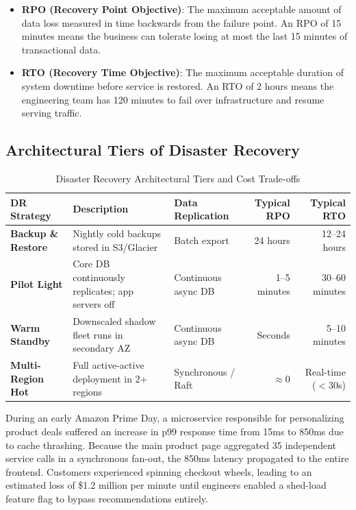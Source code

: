 \begin{itemize}[leftmargin=18pt]
  \item \textbf{RPO (Recovery Point Objective)}: The maximum acceptable amount of data loss measured in time backwards from the failure point. An RPO of 15 minutes means the business can tolerate losing at most the last 15 minutes of transactional data.
  \item \textbf{RTO (Recovery Time Objective)}: The maximum acceptable duration of system downtime before service is restored. An RTO of 2 hours means the engineering team has 120 minutes to fail over infrastructure and resume serving traffic.
\end{itemize}

\subsection{Architectural Tiers of Disaster Recovery}

\begin{table}[htbp]
\centering\small
\begin{tabular}{lllrr}
\toprule
\textbf{DR Strategy} & \textbf{Description} & \textbf{Data Replication} & \textbf{Typical RPO} & \textbf{Typical RTO} \\
\midrule
\textbf{Backup \& Restore} & Nightly cold backups stored in S3/Glacier & Batch export & 24 hours & 12--24 hours \\
\textbf{Pilot Light} & Core DB continuously replicates; app servers off & Continuous async DB & 1--5 minutes & 30--60 minutes \\
\textbf{Warm Standby} & Downscaled shadow fleet runs in secondary AZ & Continuous async DB & Seconds & 5--10 minutes \\
\textbf{Multi-Region Hot} & Full active-active deployment in 2+ regions & Synchronous / Raft & $\approx 0$ & Real-time ($<30$s) \\
\bottomrule
\end{tabular}
\caption{Disaster Recovery Architectural Tiers and Cost Trade-offs}
\label{tab:dr-tiers}
\end{table}

\begin{realworldbox}
During an early Amazon Prime Day, a microservice responsible for personalizing product deals suffered an increase in p99 response time from 15ms to 850ms due to cache thrashing. Because the main product page aggregated 35 independent service calls in a synchronous fan-out, the 850ms latency propagated to the entire frontend. Customers experienced spinning checkout wheels, leading to an estimated loss of \$1.2 million per minute until engineers enabled a shed-load feature flag to bypass recommendations entirely.
\end{realworldbox}

